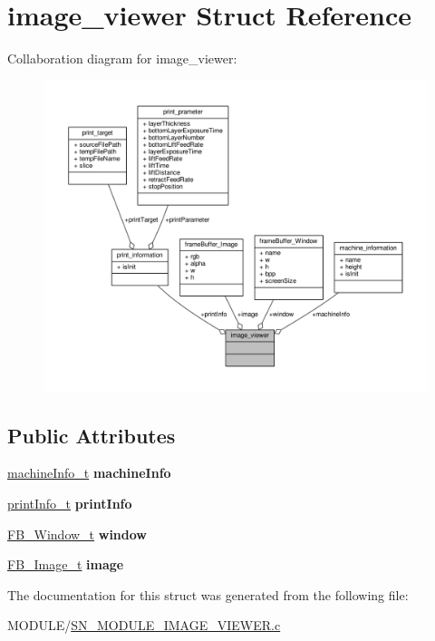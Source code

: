 \hypertarget{structimage__viewer}{}\section{image\+\_\+viewer Struct Reference}
\label{structimage__viewer}


Collaboration diagram for image\+\_\+viewer\+:
\nopagebreak
\begin{figure}[H]
\begin{center}
\leavevmode
\includegraphics[width=350pt]{structimage__viewer__coll__graph}
\end{center}
\end{figure}
\subsection*{Public Attributes}
\begin{DoxyCompactItemize}
\item 
\mbox{\label{structimage__viewer_ae34bb6294b7789eaaa37a917592d0a2c}} 
\hyperlink{structmachine__information}{machine\+Info\+\_\+t} {\bfseries machine\+Info}
\item 
\mbox{\label{structimage__viewer_a3f7d3425748942aaceb6dc66408d6355}} 
\hyperlink{structprint__information}{print\+Info\+\_\+t} {\bfseries print\+Info}
\item 
\mbox{\label{structimage__viewer_ab7e43de4e844eefd9b3f709b46da96bb}} 
\hyperlink{structframeBuffer__Window}{F\+B\+\_\+\+Window\+\_\+t} {\bfseries window}
\item 
\mbox{\label{structimage__viewer_a139168d59eaa9a4e94bf3c8df8059fee}} 
\hyperlink{structframeBuffer__Image}{F\+B\+\_\+\+Image\+\_\+t} {\bfseries image}
\end{DoxyCompactItemize}


The documentation for this struct was generated from the following file\+:\begin{DoxyCompactItemize}
\item 
M\+O\+D\+U\+L\+E/\hyperlink{SN__MODULE__IMAGE__VIEWER_8c}{S\+N\+\_\+\+M\+O\+D\+U\+L\+E\+\_\+\+I\+M\+A\+G\+E\+\_\+\+V\+I\+E\+W\+E\+R.\+c}\end{DoxyCompactItemize}

